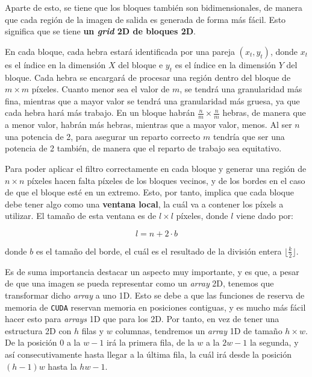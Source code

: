 \documentclass[11pt,a4paper]{article}
\begin{document}
Aparte de esto, se tiene que los bloques también son bidimensionales, de manera que cada región
de la imagen de salida es generada de forma más fácil. Esto significa que se tiene \textbf{un
\textit{grid} 2D de bloques 2D}.

En cada bloque, cada hebra estará identificada por una pareja $(x_t, y_t)$, donde $x_t$ es el
índice en la dimensión $X$ del bloque e $y_t$ es el índice en la dimensión $Y$ del bloque.
Cada hebra se encargará de procesar una región dentro del bloque de $m \times m$ píxeles.
Cuanto menor sea el valor de $m$, se tendrá una granularidad más fina, mientras que a mayor
valor se tendrá una granularidad más gruesa, ya que cada hebra hará más trabajo. En un bloque
habrán $\frac{n}{m} \times \frac{n}{m}$ hebras, de manera que a menor valor, habrán más hebras,
mientras que a mayor valor, menos. Al ser $n$ una potencia de 2, para asegurar un reparto
correcto $m$ tendría que ser una potencia de 2 también, de manera que el reparto de trabajo
sea equitativo.

Para poder aplicar el filtro correctamente en cada bloque y generar una región de $n \times n$
píxeles hacen falta píxeles de los bloques vecinos, y de los bordes en el caso de que el bloque
esté en un extremo. Esto, por tanto, implica que cada bloque debe tener algo como una
\textbf{ventana local}, la cuál va a contener los píxels a utilizar. El tamaño de esta ventana
es de $l \times l$ píxeles, donde $l$ viene dado por:

\begin{equation}
l = n + 2 \cdot b
\end{equation}

\noindent donde $b$ es el tamaño del borde, el cuál es el resultado de la división entera
$\lfloor \frac{k}{2} \rfloor$.

Es de suma importancia destacar un aspecto muy importante, y es que, a pesar de que una
imagen se pueda representar como un \textit{array} 2D, tenemos que transformar dicho
\textit{array} a uno 1D. Esto se debe a que las funciones de reserva de memoria de
\texttt{CUDA} reservan memoria en posiciones contiguas, y es mucho más fácil hacer esto para
\textit{arrays} 1D que para los 2D. Por tanto, en vez de tener una estructura 2D con $h$ filas
y $w$ columnas, tendremos un \textit{array} 1D de tamaño $h \times w$. De la posición $0$ a
la $w-1$ irá la primera fila, de la $w$ a la $2w - 1$ la segunda, y así consecutivamente hasta
llegar a la última fila, la cuál irá desde la posición $(h-1)w$ hasta la $hw - 1$.
\end{document}
